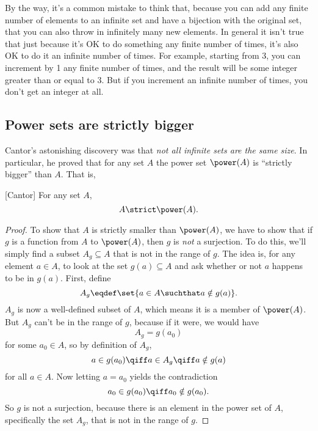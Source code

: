 By the way, it's a common mistake to think that, because you can add
any finite number of elements to an infinite set and have a bijection
with the original set, that you can also throw in infinitely many new
elements.  In general it isn't true that just because it's OK to do
something any finite number of times, it's also OK to do it an infinite
number of times.  For example, starting from 3, you can increment by 1
any finite number of times, and the result will be some integer
greater than or equal to 3.  But if you increment an infinite number
of times, you don't get an integer at all.

\subsection{Power sets are strictly bigger}

Cantor's astonishing discovery was that \emph{not all infinite sets
  are the same size}.  In particular, he proved that for any set $A$
the power set $\power(A)$ is ``strictly bigger'' than
$A$.  That is,
\begin{theorem}\label{powbig}[Cantor]\mbox{}
For any set $A$,
\[
A \strict \power(A).
\]
\end{theorem}
\begin{proof}
\iffalse
  First of all, $\power(A)$ is as big as $A$: for example, the partial
  function $f:\power(A) \to A$, where $f(\set{a}) \eqdef a$ for $a \in
  A$ and $f$ is only defined on one-element sets, is a surjection.
\fi
 
To show that $A$ is strictly smaller than $\power(A)$, we have to show
that if $g$ is a function from $A$ to $\power(A)$, then $g$ is \emph{not} a
surjection.  To do this, we'll simply find a subset $A_g \subseteq A$
that is not in the range of $g$.  The idea is, for any element $a \in
A$, to look at the set $g(a) \subseteq A$ and ask whether or not $a$
happens to be in $g(a)$.  First, define \iffalse mimicking Russell's
Paradox,\fi
  \[
  A_g \eqdef \set{a \in A \suchthat a \notin g(a)}.
  \]
  $A_g$ is now a well-defined subset of $A$, which means it is a
  member of $\power(A)$.  But $A_g$ can't be in the range of $g$,
  because if it were, we would have
\[
A_g = g(a_0)
\]
for some $a_0 \in A$, so by definition of $A_g$,
\[
a \in g(a_0) \qiff a \in A_g \qiff a \notin g(a)
\]
for all $a \in A$.  Now letting $a = a_0$ yields the contradiction
\[
a_0 \in g(a_0) \qiff a_0 \notin g(a_0).
\]
So $g$ is not a surjection, because there is an element in the power
set of $A$, specifically the set $A_g$, that is not in the range of $g$.
\end{proof}


